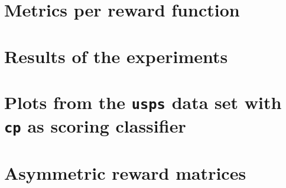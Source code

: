 \documentclass[twoside,11pt]{article}
\begin{document}
\renewcommand{\appendixpagename}{\Large Appendices}
\begin{appendices}

  \section{Metrics per reward function}
  \label{sec:metrics_rew}

  

  \newpage

  \section{Results of the experiments}
  \label{sec:res}

  

  \newpage

  \section{Plots from the \texttt{usps} data set with
           \texttt{cp} as scoring classifier}
  \label{sec:plots}

  

  \newpage

  \section{Asymmetric reward matrices}
  \label{sec:asym_rew_mat}

  \setcounter{MaxMatrixCols}{11}


\end{appendices}
\end{document}
